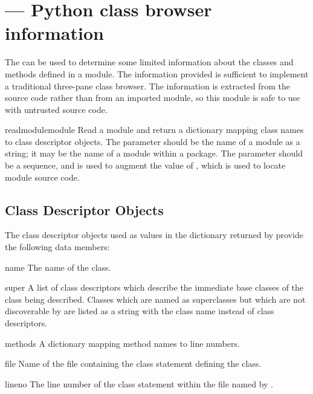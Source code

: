 \section{ ---
         Python class browser information}



The  can be used to determine some limited information
about the classes and methods defined in a module.  The information
provided is sufficient to implement a traditional three-pane class
browser.  The information is extracted from the source code rather
than from an imported module, so this module is safe to use with
untrusted source code.


\begin{funcdesc}{readmodule}{module}
  Read a module and return a dictionary mapping class names to class
  descriptor objects.  The parameter  should be the name
  of a module as a string; it may be the name of a module within a
  package.  The  parameter should be a sequence, and is used
  to augment the value of , which is used to locate
  module source code.
\end{funcdesc}


\subsection{Class Descriptor Objects \label{pyclbr-class-objects}}

The class descriptor objects used as values in the dictionary returned
by  provide the following data members:


\begin{memberdesc}{name}
  The name of the class.
\end{memberdesc}

\begin{memberdesc}{super}
  A list of class descriptors which describe the immediate base
  classes of the class being described.  Classes which are named as
  superclasses but which are not discoverable by
   are listed as a string with the class name
  instead of class descriptors.
\end{memberdesc}

\begin{memberdesc}{methods}
  A dictionary mapping method names to line numbers.
\end{memberdesc}

\begin{memberdesc}{file}
  Name of the file containing the class statement defining the class.
\end{memberdesc}

\begin{memberdesc}{lineno}
  The line number of the class statement within the file named by
  .
\end{memberdesc}
